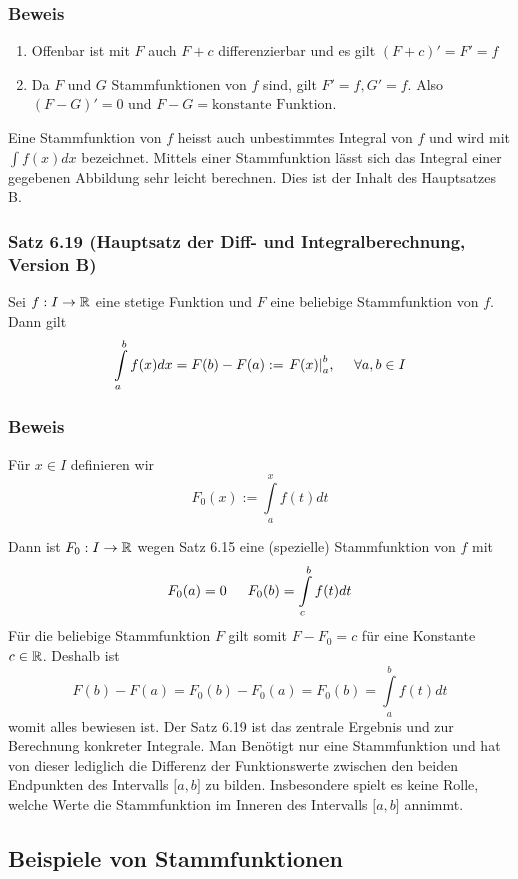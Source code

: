 \subsubsection*{Beweis}
\begin{enumerate}[\indent (a)]
\item Offenbar ist mit $F$ auch $F+c$ differenzierbar und es gilt $(F+c)'=F'=f$
\item Da $F$ und $G$ Stammfunktionen von $f$ sind, gilt $F'=f, G'=f$. Also $(F-G)'=0$ und $F-G=\text{konstante Funktion}$.
\end{enumerate}

\begin{definition}{6.18}
 Eine Stammfunktion von $f$ heisst auch unbestimmtes Integral von $f$ und wird mit $\int {f(x)dx}$ bezeichnet. Mittels einer Stammfunktion lässt sich das Integral einer gegebenen Abbildung sehr leicht berechnen. Dies ist der Inhalt des Hauptsatzes B.\\
\end{definition}
\subsubsection*{Satz 6.19 (Hauptsatz der Diff- und Integralberechnung, Version B)}
Sei $f:I\to\mathbb{R}$ eine stetige Funktion und $F$ eine beliebige Stammfunktion von $f$. Dann gilt \[\int\limits_a^b {f(x)dx = F(b) - F(a): = \left. {F(x)} \right|_a^b}\text{,\indent}\forall a,b\in I \]

\subsubsection*{Beweis}
Für $x\in I$ definieren wir \[F_0(x):=\int\limits_a^x {f(t)dt} \]

Dann ist $F_0:I\to\mathbb{R}$ wegen Satz 6.15 eine (spezielle) Stammfunktion von $f$ mit \[{F_0}(a) = 0\text{\indent}{F_0}(b) = \int\limits_c^b {f(t)dt} \]
Für die beliebige Stammfunktion $F$ gilt somit $F-F_0=c$ für eine Konstante $c\in\mathbb{R}$. Deshalb ist \[F(b) - F(a) = {F_0}(b) - {F_0}(a) = {F_0}(b) = \int\limits_a^b {f(t)dt} \] womit alles bewiesen ist. Der Satz 6.19 ist das zentrale Ergebnis und zur Berechnung konkreter Integrale. Man Benötigt nur eine Stammfunktion und hat von dieser lediglich die Differenz der Funktionswerte zwischen den beiden Endpunkten des Intervalls $\lbrack a,b\rbrack$ zu bilden.
Insbesondere spielt es keine Rolle, welche Werte die Stammfunktion im Inneren des Intervalls  $\lbrack a,b\rbrack$ annimmt.
\subsection*{Beispiele von Stammfunktionen}

